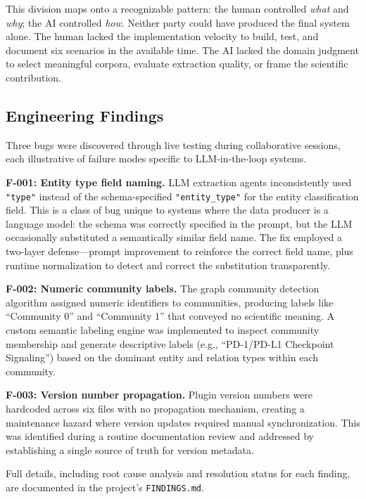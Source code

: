 This division maps onto a recognizable pattern: the human controlled \textit{what} and \textit{why}; the AI controlled \textit{how}. Neither party could have produced the final system alone. The human lacked the implementation velocity to build, test, and document six scenarios in the available time. The AI lacked the domain judgment to select meaningful corpora, evaluate extraction quality, or frame the scientific contribution.

\subsection{Engineering Findings}

Three bugs were discovered through live testing during collaborative sessions, each illustrative of failure modes specific to LLM-in-the-loop systems.

\textbf{F-001: Entity type field naming.} LLM extraction agents inconsistently used \texttt{"type"} instead of the schema-specified \texttt{"entity\_type"} for the entity classification field. This is a class of bug unique to systems where the data producer is a language model: the schema was correctly specified in the prompt, but the LLM occasionally substituted a semantically similar field name. The fix employed a two-layer defense---prompt improvement to reinforce the correct field name, plus runtime normalization to detect and correct the substitution transparently.

\textbf{F-002: Numeric community labels.} The graph community detection algorithm assigned numeric identifiers to communities, producing labels like ``Community 0'' and ``Community 1'' that conveyed no scientific meaning. A custom semantic labeling engine was implemented to inspect community membership and generate descriptive labels (e.g., ``PD-1/PD-L1 Checkpoint Signaling'') based on the dominant entity and relation types within each community.

\textbf{F-003: Version number propagation.} Plugin version numbers were hardcoded across six files with no propagation mechanism, creating a maintenance hazard where version updates required manual synchronization. This was identified during a routine documentation review and addressed by establishing a single source of truth for version metadata.

Full details, including root cause analysis and resolution status for each finding, are documented in the project's \texttt{FINDINGS.md}.
